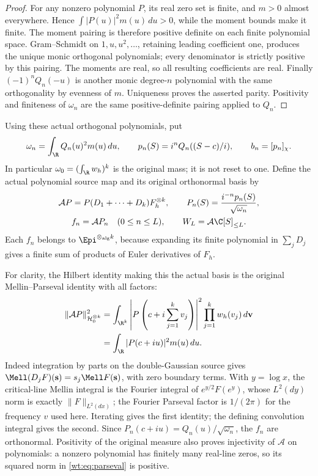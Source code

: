 \begin{proof}
For any nonzero polynomial $P$, its real zero set is finite,
and $m>0$ almost everywhere.  Hence
$\int |P(u)|^2m(u)\,du>0$, while the moment bounds make it
finite.  The moment pairing is therefore positive definite
on each finite polynomial space.  Gram--Schmidt on
$1,u,u^2,\ldots$, retaining leading coefficient one, produces
the unique monic orthogonal polynomials; every denominator is
strictly positive by this pairing.  The moments are real,
so all resulting coefficients are real.  Finally
$(-1)^nQ_n(-u)$ is another monic degree-$n$ polynomial with
the same orthogonality by evenness of $m$.  Uniqueness proves
the asserted parity.  Positivity and finiteness of $\omega_n$
are the same positive-definite pairing applied to $Q_n$.
\end{proof}

Using these actual orthogonal polynomials, put
\[
 \omega_n=\int_\R Q_n(u)^2m(u)\,du,\qquad
 p_n(S)=i^nQ_n((S-c)/i),\qquad b_n=[p_n]_\chi.
\]
In particular $\omega_0=(\int_\R w_h)^k$ is the original mass;
it is not reset to one.  Define the actual polynomial source map
and its original orthonormal basis by
\begin{equation}\label{wt:eq:actual-source}
\begin{gathered}
 \mathcal AP=P(D_1+\cdots+D_k)F_h^{\otimes k},\qquad
 P_n(S)=\frac{i^{-n}p_n(S)}{\sqrt{\omega_n}},\\
 f_n=\mathcal AP_n\quad(0\leq n\leq L),\qquad
 W_L=\mathcal A\C[S]_{\leq L}.
\end{gathered}
\end{equation}
Each $f_n$ belongs to $\Epi^{\otimes_{\mathrm{alg}} k}$,
because expanding its finite polynomial in $\sum_jD_j$ gives
a finite sum of products of Euler derivatives of $F_h$.

For clarity, the Hilbert identity making this the actual basis
is the original Mellin--Parseval identity with all factors:
\begin{equation}\label{wt:eq:parseval}
 \begin{split}
 \|\mathcal AP\|_{\mathcal H_0^{\otimes k}}^2
 &=\int_{\R^k}\left|P\left(c+i\sum_{j=1}^kv_j\right)\right|^2
              \prod_{j=1}^kw_h(v_j)\,d\mathbf v\\
 &=\int_\R|P(c+iu)|^2m(u)\,du.
 \end{split}
\end{equation}
Indeed integration by parts on the double-Gaussian source gives
$\Mell(D_jF)(\mathbf s)=s_j\Mell F(\mathbf s)$, with zero
boundary terms.  With $y=\log x$, the critical-line Mellin
integral is the Fourier integral of $e^{y/2}F(e^y)$, whose
$L^2(dy)$ norm is exactly $\|F\|_{L^2(dx)}$; the Fourier
Parseval factor is $1/(2\pi)$ for the frequency $v$ used here.
Iterating gives the first identity; the defining convolution
integral gives the second.  Since $P_n(c+iu)=Q_n(u)/\sqrt{\omega_n}$,
the $f_n$ are orthonormal.  Positivity of the original measure
also proves injectivity of $\mathcal A$ on polynomials: a nonzero
polynomial has finitely many real-line zeros, so its squared
norm in \eqref{wt:eq:parseval} is positive.

